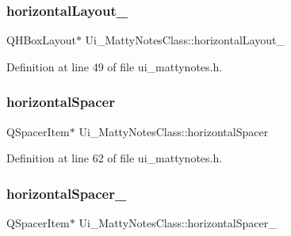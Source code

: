 \hypertarget{classUi__MattyNotesClass_a5cb2d28d113d4b473d55b47c7370582c}{}\label{classUi__MattyNotesClass_a5cb2d28d113d4b473d55b47c7370582c} 
\subsubsection{\texorpdfstring{horizontal\+Layout\+\_}{horizontalLayout\_9}}
{\footnotesize\ttfamily Q\+H\+Box\+Layout$\ast$ Ui\+\_\+\+Matty\+Notes\+Class\+::horizontal\+Layout\+\_}



Definition at line 49 of file ui\+\_\+mattynotes.\+h.

\hypertarget{classUi__MattyNotesClass_ac4b0de0a29ecefe9ab9355af44d9996a}{}\label{classUi__MattyNotesClass_ac4b0de0a29ecefe9ab9355af44d9996a} 
\subsubsection{\texorpdfstring{horizontal\+Spacer}{horizontalSpacer}}
{\footnotesize\ttfamily Q\+Spacer\+Item$\ast$ Ui\+\_\+\+Matty\+Notes\+Class\+::horizontal\+Spacer}



Definition at line 62 of file ui\+\_\+mattynotes.\+h.

\hypertarget{classUi__MattyNotesClass_a5d039495d4d89675b39f564a77484c6e}{}\label{classUi__MattyNotesClass_a5d039495d4d89675b39f564a77484c6e} 
\subsubsection{\texorpdfstring{horizontal\+Spacer\+\_}{horizontalSpacer\_2}}
{\footnotesize\ttfamily Q\+Spacer\+Item$\ast$ Ui\+\_\+\+Matty\+Notes\+Class\+::horizontal\+Spacer\+\_}



